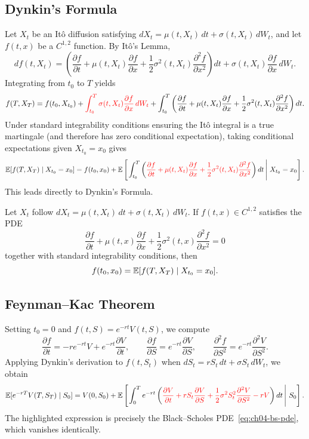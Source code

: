 \subsection{Dynkin's Formula}
Let $X_t$ be an It\^o diffusion satisfying $dX_t = \mu(t, X_t)\,dt + \sigma(t, X_t)\,dW_t$, and let $f(t, x)$ be a $C^{1,2}$ function. By It\^o's Lemma,
\[
    df(t, X_t)
    = \left(\frac{\partial f}{\partial t} + \mu(t, X_t)\frac{\partial f}{\partial x} + \frac{1}{2}\sigma^2(t, X_t)\frac{\partial^2 f}{\partial x^2}\right)dt
    + \sigma(t, X_t)\frac{\partial f}{\partial x}\,dW_t.
\]
Integrating from $t_0$ to $T$ yields
\[
    f(T, X_T) = f(t_0, X_{t_0})
    + \textcolor{red}{\int_{t_0}^T \sigma(t, X_t)\frac{\partial f}{\partial x}\,dW_t}
    + \int_{t_0}^T \left(\frac{\partial f}{\partial t} + \mu(t, X_t)\frac{\partial f}{\partial x} + \frac{1}{2}\sigma^2(t, X_t)\frac{\partial^2 f}{\partial x^2}\right)dt.
\]
Under standard integrability conditions ensuring the It\^o integral is a true martingale (and therefore has zero conditional expectation), taking conditional expectations given $X_{t_0} = x_0$ gives
\[
    \mathbb{E}[f(T, X_T) \mid X_{t_0} = x_0]
    = f(t_0, x_0)
    + \mathbb{E}\left[\left.\int_{t_0}^T \left(\textcolor{red}{\frac{\partial f}{\partial t} + \mu(t, X_t)\frac{\partial f}{\partial x} + \frac{1}{2}\sigma^2(t, X_t)\frac{\partial^2 f}{\partial x^2}}\right)dt \,\right|\, X_{t_0} = x_0\right].
\]
This leads directly to Dynkin's Formula.

\begin{theorem}
    \label{thm:ch04-dynkin}
    Let $X_t$ follow $dX_t = \mu(t, X_t)\,dt + \sigma(t, X_t)\,dW_t$. If $f(t, x) \in C^{1,2}$ satisfies the PDE
    \[
        \frac{\partial f}{\partial t} + \mu(t, x)\frac{\partial f}{\partial x} + \frac{1}{2}\sigma^2(t, x)\frac{\partial^2 f}{\partial x^2} = 0
    \]
    together with standard integrability conditions, then
    \[
        f(t_0, x_0) = \mathbb{E}[f(T, X_T) \mid X_{t_0} = x_0].
    \]
\end{theorem}

\subsection{Feynman--Kac Theorem}
Setting $t_0 = 0$ and $f(t, S) = e^{-rt}V(t, S)$, we compute
\[
    \frac{\partial f}{\partial t} = -r e^{-rt}V + e^{-rt}\frac{\partial V}{\partial t}, \qquad
    \frac{\partial f}{\partial S} = e^{-rt}\frac{\partial V}{\partial S}, \qquad
    \frac{\partial^2 f}{\partial S^2} = e^{-rt}\frac{\partial^2 V}{\partial S^2}.
\]
Applying Dynkin's derivation to $f(t, S_t)$ when $dS_t = r S_t\,dt + \sigma S_t\,dW_t$, we obtain
\[
    \mathbb{E}[e^{-rT} V(T, S_T) \mid S_0]
    = V(0, S_0)
    + \mathbb{E}\left[\left.\int_0^T e^{-rt}\left(\textcolor{red}{\frac{\partial V}{\partial t} + r S_t \frac{\partial V}{\partial S} + \frac{1}{2}\sigma^2 S_t^2 \frac{\partial^2 V}{\partial S^2} - r V}\right)dt \,\right|\, S_0\right].
\]
The highlighted expression is precisely the Black--Scholes PDE~\eqref{eq:ch04-bs-pde}, which vanishes identically.

